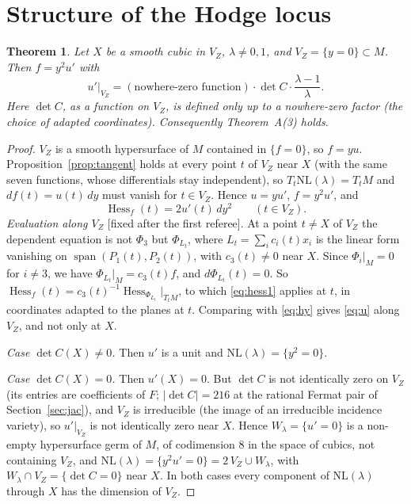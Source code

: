 \documentclass[10pt]{article}
\numberwithin{equation}{section}
\newtheorem{theorem}{Theorem}[section]
\theoremstyle{remark}
\newcommand{\NL}{\mathrm{NL}}
\newcommand{\VZ}{V_Z}
\newcommand{\Hess}{\operatorname{Hess}}
\begin{document}
\section{Structure of the Hodge locus}\label{sec:structure}
\begin{theorem}\label{thm:structure}
Let $X$ be a smooth cubic in $\VZ$, $\lambda\neq0,1$, and $\VZ=\{y=0\}\subset M$. Then $f=y^2u'$ with
\begin{equation}\label{eq:u}
u'|_{\VZ}=(\text{nowhere-zero function})\cdot\det C\cdot\frac{\lambda-1}{\lambda}.
\end{equation}
Here $\det C$, as a function on $\VZ$, is defined only up to a nowhere-zero factor \textup{(}the choice of
adapted coordinates\textup{)}. Consequently Theorem~A\textup{(3)} holds.
\end{theorem}
\begin{proof}
$\VZ$ is a smooth hypersurface of $M$ contained in $\{f=0\}$, so $f=yu$. Proposition~\ref{prop:tangent} holds
at every point $t$ of $\VZ$ near $X$ (with the same seven functions, whose differentials stay independent), so
$T_t\NL(\lambda)=T_tM$ and $df(t)=u(t)\,dy$ must vanish for $t\in\VZ$. Hence $u=yu'$, $f=y^2u'$, and
\begin{equation}\label{eq:hy}
\Hess_f(t)=2u'(t)\,dy^2\qquad(t\in\VZ).
\end{equation}
\emph{Evaluation along $\VZ$} [fixed after the first referee]. At a point $t\neq X$ of $\VZ$ the dependent
equation is not $\Phi_3$ but $\Phi_{L_t}$, where $L_t=\sum_ic_i(t)x_i$ is the linear form vanishing on
$\operatorname{span}(P_1(t),P_2(t))$, with $c_3(t)\neq0$ near $X$. Since $\Phi_i|_M=0$ for $i\ne3$, we have
$\Phi_{L_t}|_M=c_3(t)f$, and $d\Phi_{L_t}(t)=0$. So $\Hess_f(t)=c_3(t)^{-1}\Hess_{\Phi_{L_t}}|_{T_tM}$, to which
\eqref{eq:hess1} applies at $t$, in coordinates adapted to the planes at $t$. Comparing with \eqref{eq:hy} gives
\eqref{eq:u} along $\VZ$, and not only at $X$.

\emph{Case $\det C(X)\ne0$.} Then $u'$ is a unit and $\NL(\lambda)=\{y^2=0\}$.

\emph{Case $\det C(X)=0$.} Then $u'(X)=0$. But $\det C$ is not identically zero on $\VZ$ (its entries are
coefficients of $F$; $|\det C|=216$ at the rational Fermat pair of Section~\ref{sec:jac}), and $\VZ$ is
irreducible (the image of an irreducible incidence variety), so $u'|_{\VZ}$ is not identically zero near $X$.
Hence $W_\lambda=\{u'=0\}$ is a non-empty hypersurface germ of $M$, of codimension $8$ in the space of cubics,
not containing $\VZ$, and $\NL(\lambda)=\{y^2u'=0\}=2\,\VZ\cup W_\lambda$, with
$W_\lambda\cap\VZ=\{\det C=0\}$ near $X$. In both cases every component of $\NL(\lambda)$ through $X$ has the
dimension of $\VZ$.
\end{proof}
\end{document}
